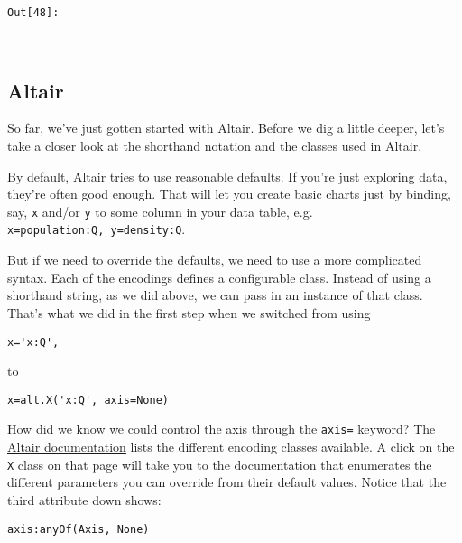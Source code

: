 \documentclass[11pt]{article}
\begin{document}
\texttt{\color{outcolor}Out[{\color{outcolor}48}]:}
    
    \begin{center}
    \end{center}
    { \hspace*{\fill} \\}
    

    \subsection{Altair}\label{altair}

So far, we've just gotten started with Altair. Before we dig a little
deeper, let's take a closer look at the shorthand notation and the
classes used in Altair.

By default, Altair tries to use reasonable defaults. If you're just
exploring data, they're often good enough. That will let you create
basic charts just by binding, say, \texttt{x} and/or \texttt{y} to some
column in your data table, e.g.
\texttt{x=\textquotesingle{}population:Q\textquotesingle{},\ y=\textquotesingle{}density:Q\textquotesingle{}}.

But if we need to override the defaults, we need to use a more
complicated syntax. Each of the encodings defines a configurable class.
Instead of using a shorthand string, as we did above, we can pass in an
instance of that class. That's what we did in the first step when we
switched from using

\begin{verbatim}
x='x:Q',
\end{verbatim}

to

\begin{verbatim}
x=alt.X('x:Q', axis=None)
\end{verbatim}

How did we know we could control the axis through the \texttt{axis=}
keyword? The
\href{https://altair-viz.github.io/user_guide/encoding.html\#encoding-channels}{Altair
documentation} lists the different encoding classes available. A click
on the \texttt{X} class on that page will take you to the documentation
that enumerates the different parameters you can override from their
default values. Notice that the third attribute down shows:

\begin{verbatim}
axis:anyOf(Axis, None)
\end{verbatim}
\end{document}
